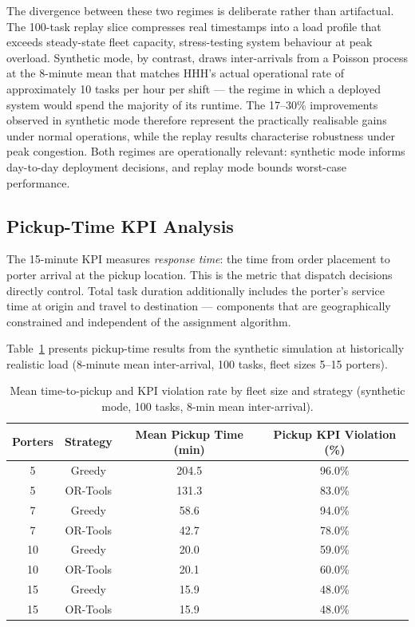 \documentclass[12pt,a4paper]{article}
\begin{document}
The divergence between these two regimes is deliberate rather than artifactual. The 100-task replay slice compresses real timestamps into a load profile that exceeds steady-state fleet capacity, stress-testing system behaviour at peak overload. Synthetic mode, by contrast, draws inter-arrivals from a Poisson process at the 8-minute mean that matches HHH's actual operational rate of approximately 10 tasks per hour per shift --- the regime in which a deployed system would spend the majority of its runtime. The 17--30\% improvements observed in synthetic mode therefore represent the practically realisable gains under normal operations, while the replay results characterise robustness under peak congestion. Both regimes are operationally relevant: synthetic mode informs day-to-day deployment decisions, and replay mode bounds worst-case performance.

\subsection{Pickup-Time KPI Analysis}
\label{sec:pickup}

The 15-minute KPI measures \textit{response time}: the time from order placement to porter arrival at the pickup location. This is the metric that dispatch decisions directly control. Total task duration additionally includes the porter's service time at origin and travel to destination --- components that are geographically constrained and independent of the assignment algorithm.

Table~\ref{tab:pickup} presents pickup-time results from the synthetic simulation at historically realistic load (8-minute mean inter-arrival, 100 tasks, fleet sizes 5--15 porters).

\begin{table}[H]
\centering
\caption{Mean time-to-pickup and KPI violation rate by fleet size and strategy (synthetic mode, 100 tasks, 8-min mean inter-arrival).}
\label{tab:pickup}
\begin{tabular}{cccc}
\toprule
\textbf{Porters} & \textbf{Strategy} & \textbf{Mean Pickup Time (min)} & \textbf{Pickup KPI Violation (\%)} \\
\midrule
5  & Greedy   & 204.5 & 96.0\% \\
5  & OR-Tools & 131.3 & 83.0\% \\
\midrule
7  & Greedy   & 58.6  & 94.0\% \\
7  & OR-Tools & 42.7  & 78.0\% \\
\midrule
10 & Greedy   & 20.0  & 59.0\% \\
10 & OR-Tools & 20.1  & 60.0\% \\
\midrule
15 & Greedy   & 15.9  & 48.0\% \\
15 & OR-Tools & 15.9  & 48.0\% \\
\bottomrule
\end{tabular}
\end{table}
\end{document}
